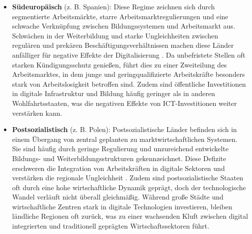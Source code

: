 \begin{itemize}
    \item \textbf{Südeuropäisch} (z. B. Spanien): Diese Regime zeichnen sich durch 
    segmentierte Arbeitsmärkte, starre Arbeitsmarktregulierungen und eine schwache 
    Verknüpfung zwischen Bildungssystemen und Arbeitsmarkt aus. Schwächen in der Weiterbildung 
    und starke Ungleichheiten zwischen regulären und prekären Beschäftigungsverhältnissen 
    machen diese Länder anfälliger für negative Effekte der Digitalisierung 
    \parencite[S. 17–21]{ferrera1996thesouthern}. Da unbefristete Stellen oft starken 
    Kündigungsschutz genießen, führt dies zu einer Zweiteilung des Arbeitsmarktes, in dem junge und 
    geringqualifizierte Arbeitskräfte besonders stark von Arbeitslosigkeit betroffen sind. Zudem sind 
    öffentliche Investitionen in digitale Infrastruktur und Bildung häufig geringer als in anderen 
    Wohlfahrtsstaaten, was die negativen Effekte von \ac{ICT}-Investitionen weiter verstärken kann.
    
    \item \textbf{Postsozialistisch} (z. B. Polen): Postsozialistische Länder befinden sich 
    in einem Übergang von zentral geplanten zu marktwirtschaftlichen Systemen. Sie sind 
    häufig durch geringe Regulierung und unzureichend entwickelte Bildungs- und 
    Weiterbildungsstrukturen gekennzeichnet. Diese Defizite erschweren die Integration von 
    Arbeitskräften in digitale Sektoren und verstärken die regionale Ungleichheit 
    \parencite[S. 88–93]{cerami2006socialpolicy}. Zudem sind postsozialistische Staaten oft durch 
    eine hohe wirtschaftliche Dynamik geprägt, doch der technologische Wandel verläuft nicht überall 
    gleichmäßig. Während große Städte und wirtschaftliche Zentren stark in digitale Technologien 
    investieren, bleiben ländliche Regionen oft zurück, was zu einer wachsenden Kluft zwischen 
    digital integrierten und traditionell geprägten Wirtschaftssektoren führt.
    
\end{itemize}

